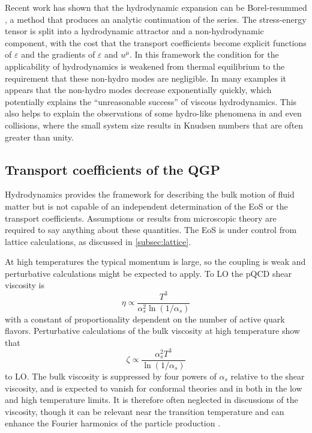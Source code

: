 Recent work has shown that the hydrodynamic expansion can be Borel-resummed \cite{Romatschke:2016hle,Romatschke:2017vte}, a method that produces an analytic continuation of the series.
The stress-energy tensor is split into a hydrodynamic attractor and a non-hydrodynamic component, with the cost that the transport coefficients become explicit functions of $\varepsilon$ and the gradients of $\varepsilon$ and $u^\mu$.
In this framework the condition for the applicability of hydrodynamics is weakened from thermal equilibrium to the requirement that these non-hydro modes are negligible.
In many examples it appears that the non-hydro modes decrease exponentially quickly, which potentially explains the ``unreasonable success'' of viscous hydrodynamics.
This also helps to explain the observations of some hydro-like phenomena in \pPb and even \pp collisions, where the small system size results in Knudsen numbers that are often greater than unity.


\subsection{Transport coefficients of the QGP} %

Hydrodynamics provides the framework for describing the bulk motion of fluid matter but is not capable of an independent determination of the \ac{EoS} or the transport coefficients.
Assumptions or results from microscopic theory are required to say anything about these quantities.
The \qcd \ac{EoS} is under control from lattice calculations, as discussed in \cref{subsec:lattice}. %

At high temperatures the typical momentum is large, so the coupling is weak and perturbative calculations might be expected to apply.
To \ac{LO} the \ac{pQCD} shear viscosity is \cite{Arnold:2000dr}
\begin{equation}
\eta \propto \frac{T^3}{\alpha_s^2 \ln \left( 1/\alpha_s\right) }
\end{equation}
with a constant of proportionality dependent on the number of active quark flavors.
Perturbative calculations of the bulk viscosity at high temperature show that \cite{Arnold:2006fz}
\begin{equation}
\zeta \propto \frac{\alpha_s^2 T^3}{\ln \left(1/\alpha_s\right)}
\end{equation}
to \ac{LO}.
The bulk viscosity is suppressed by four powers of $\alpha_s$ relative to the shear viscosity, and is expected to vanish for conformal theories and in both in the low and high temperature limits.
It is therefore often neglected in discussions of the \qgp viscosity, though it can be relevant near the transition temperature and can enhance the Fourier harmonics of the particle production \cite{Noronha-Hostler:2013gga}.

